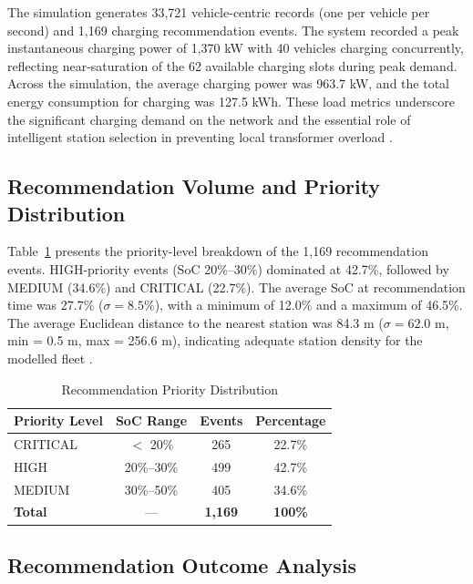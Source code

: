 \documentclass[conference]{IEEEtran}
\begin{document}
The simulation generates 33,721 vehicle-centric records (one per vehicle per second) and 1,169 charging recommendation events. The system recorded a peak instantaneous charging power of 1,370 kW with 40 vehicles charging concurrently, reflecting near-saturation of the 62 available charging slots during peak demand. Across the simulation, the average charging power was 963.7 kW, and the total energy consumption for charging was 127.5 kWh. These load metrics underscore the significant charging demand on the network and the essential role of intelligent station selection in preventing local transformer overload \cite{b14}.

\subsection{Recommendation Volume and Priority Distribution}

Table~\ref{tab:priority} presents the priority-level breakdown of the 1,169 recommendation events. HIGH-priority events (SoC 20\%--30\%) dominated at 42.7\%, followed by MEDIUM (34.6\%) and CRITICAL (22.7\%). The average SoC at recommendation time was 27.7\% ($\sigma = 8.5\%$), with a minimum of 12.0\% and a maximum of 46.5\%. The average Euclidean distance to the nearest station was 84.3 m ($\sigma = 62.0$ m, min = 0.5 m, max = 256.6 m), indicating adequate station density for the modelled fleet \cite{b18}.

\begin{table}[htbp]
\caption{Recommendation Priority Distribution}
\label{tab:priority}
\begin{center}
\begin{tabular}{|l|c|c|c|}
\hline
\textbf{Priority Level} & \textbf{SoC Range} & \textbf{Events} & \textbf{Percentage} \\
\hline
CRITICAL & $<$ 20\%         & 265 & 22.7\% \\
\hline
HIGH     & 20\%--30\%       & 499 & 42.7\% \\
\hline
MEDIUM   & 30\%--50\%       & 405 & 34.6\% \\
\hline
\textbf{Total} & ---        & \textbf{1,169} & \textbf{100\%} \\
\hline
\end{tabular}
\end{center}
\end{table}

\subsection{Recommendation Outcome Analysis}
\end{document}
